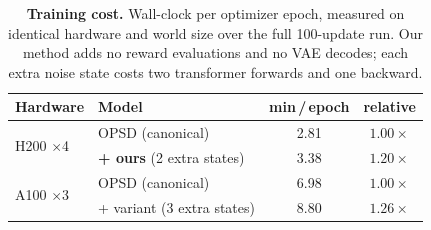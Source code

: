 \begin{table}[t]
\centering
\caption{\textbf{Training cost.} Wall-clock per optimizer epoch, measured on identical
hardware and world size over the full 100-update run. Our method adds no reward
evaluations and no VAE decodes; each extra noise state costs two transformer forwards
and one backward.}
\label{tab:cost}
\begin{tabular}{llcc}
\toprule
\textbf{Hardware} & \textbf{Model} & \textbf{min\,/\,epoch} & \textbf{relative} \\
\midrule
\multirow{2}{*}{H200 $\times$4}
 & OPSD (canonical)                        & 2.81 & $1.00\times$ \\
 & \textbf{+ ours} (2 extra states)        & 3.38 & $\mathbf{1.20\times}$ \\
\midrule
\multirow{2}{*}{A100 $\times$3}
 & OPSD (canonical)                        & 6.98 & $1.00\times$ \\
 & + variant (3 extra states)              & 8.80 & $1.26\times$ \\
\bottomrule
\end{tabular}
\end{table}
